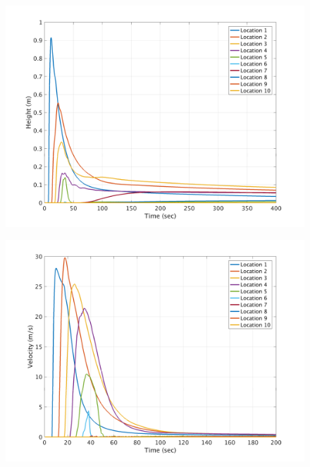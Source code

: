 \documentclass[a4paper,10pt]{article}
\begin{document}
\begin{figure}[H]
	\begin{minipage}[b]{0.5\linewidth}
	\centering
    \includegraphics[width=1\textwidth]{MeansAll/HP_all.png}
        \label{fig:M_HPall}
	\end{minipage}
	\begin{minipage}[b]{0.5\linewidth}
	\centering
    \includegraphics[width=1\textwidth]{MeansAll/VP_all.png}
        \label{fig:M_VPall}
	\end{minipage}
	

\end{figure}
\end{document}
